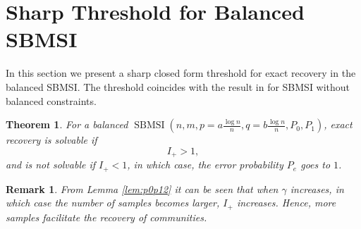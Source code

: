 \documentclass[conference]{IEEEtran}
\newtheorem{theorem}{Theorem}
\newtheorem{remark}{Remark}
\DeclareMathOperator{\SBMSI}{SBMSI}
\begin{document}
	\section{Sharp Threshold for Balanced SBMSI}\label{s:sharp}
	In this section we present a sharp closed form threshold for exact recovery in the balanced SBMSI. The threshold coincides with the result in \cite{abbe17sideinfo} for SBMSI without balanced constraints.  %
	\begin{theorem}\label{thm:Pe}
		For a balanced $\SBMSI(n,m,p=a\frac{\log n}{n},q=b\frac{\log n}{n},P_0,P_1)$, exact recovery is solvable if
		\begin{equation}\label{eq:positive_condition}
			I_+ > 1,
		\end{equation}
		and is not solvable if $I_+ < 1$, in which case, the error probability $P_e$ goes to $1$.
	\end{theorem}
	\begin{remark}
	From Lemma \ref{lem:p0p12} it can be seen that when $\gamma$ increases, in which case the number of samples becomes larger, $I_+$ increases. Hence, more samples facilitate the recovery of communities. 
	\end{remark}
\end{document}
